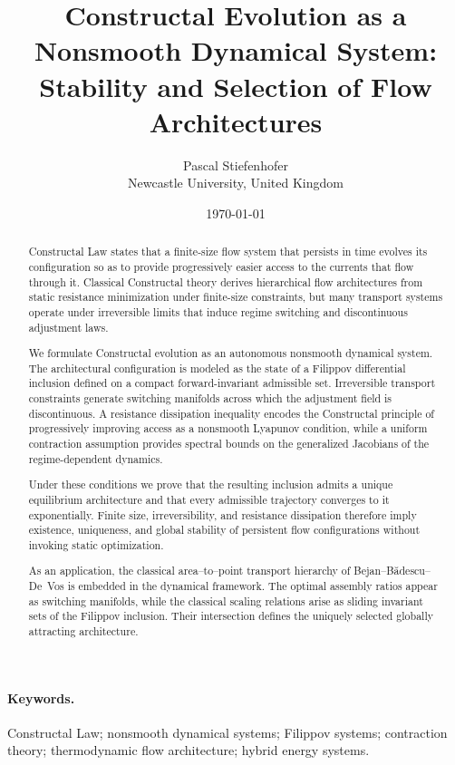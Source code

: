 \documentclass[12pt]{article}
\title{Constructal Evolution as a Nonsmooth Dynamical System: Stability and Selection of Flow Architectures}
\author{
Pascal Stiefenhofer\\
Newcastle University, United Kingdom
}
\date{\today}
\theoremstyle{plain}
\theoremstyle{definition}
\theoremstyle{remark}
\begin{document}
\maketitle

\begin{abstract}
Constructal Law states that a finite-size flow system that persists in time
evolves its configuration so as to provide progressively easier access
to the currents that flow through it.
Classical Constructal theory derives hierarchical flow architectures
from static resistance minimization under finite-size constraints,
but many transport systems operate under irreversible limits that
induce regime switching and discontinuous adjustment laws.

We formulate Constructal evolution as an autonomous nonsmooth dynamical
system. The architectural configuration is modeled as the state of a
Filippov differential inclusion defined on a compact forward-invariant
admissible set. Irreversible transport constraints generate switching
manifolds across which the adjustment field is discontinuous.
A resistance dissipation inequality encodes the Constructal principle
of progressively improving access as a nonsmooth Lyapunov condition,
while a uniform contraction assumption provides spectral bounds on the
generalized Jacobians of the regime-dependent dynamics.

Under these conditions we prove that the resulting inclusion admits a
unique equilibrium architecture and that every admissible trajectory
converges to it exponentially. Finite size, irreversibility, and
resistance dissipation therefore imply existence, uniqueness, and
global stability of persistent flow configurations without invoking
static optimization.

As an application, the classical area--to--point transport hierarchy of
Bejan--B\u{a}descu--De~Vos is embedded in the dynamical framework.
The optimal assembly ratios appear as switching manifolds, while the
classical scaling relations arise as sliding invariant sets of the
Filippov inclusion. Their intersection defines the uniquely selected
globally attracting architecture.
\end{abstract}

\paragraph{Keywords.}
Constructal Law; nonsmooth dynamical systems; Filippov systems; contraction theory;
thermodynamic flow architecture; hybrid energy systems.
\end{document}
